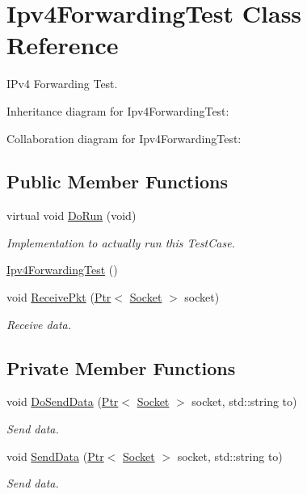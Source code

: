 \hypertarget{classIpv4ForwardingTest}{}\section{Ipv4\+Forwarding\+Test Class Reference}
\label{classIpv4ForwardingTest}


I\+Pv4 Forwarding Test.  




Inheritance diagram for Ipv4\+Forwarding\+Test\+:


Collaboration diagram for Ipv4\+Forwarding\+Test\+:
\subsection*{Public Member Functions}
\begin{DoxyCompactItemize}
\item 
virtual void \hyperlink{classIpv4ForwardingTest_aa3735e1731b087938e97f39b7d90dd35}{Do\+Run} (void)
\begin{DoxyCompactList}\small\item\em Implementation to actually run this Test\+Case. \end{DoxyCompactList}\item 
\hyperlink{classIpv4ForwardingTest_a864827a9a881afd45bb73a2d8b18f1be}{Ipv4\+Forwarding\+Test} ()
\item 
void \hyperlink{classIpv4ForwardingTest_a1dd225798eccb21f72d5f2e64765e89b}{Receive\+Pkt} (\hyperlink{classns3_1_1Ptr}{Ptr}$<$ \hyperlink{classns3_1_1Socket}{Socket} $>$ socket)
\begin{DoxyCompactList}\small\item\em Receive data. \end{DoxyCompactList}\end{DoxyCompactItemize}
\subsection*{Private Member Functions}
\begin{DoxyCompactItemize}
\item 
void \hyperlink{classIpv4ForwardingTest_a5e8130dfa935063f0a76b6b016ed5afd}{Do\+Send\+Data} (\hyperlink{classns3_1_1Ptr}{Ptr}$<$ \hyperlink{classns3_1_1Socket}{Socket} $>$ socket, std\+::string to)
\begin{DoxyCompactList}\small\item\em Send data. \end{DoxyCompactList}\item 
void \hyperlink{classIpv4ForwardingTest_acd13baacd68bf31bb1ecae14cc1fa42d}{Send\+Data} (\hyperlink{classns3_1_1Ptr}{Ptr}$<$ \hyperlink{classns3_1_1Socket}{Socket} $>$ socket, std\+::string to)
\begin{DoxyCompactList}\small\item\em Send data. \end{DoxyCompactList}\end{DoxyCompactItemize}
